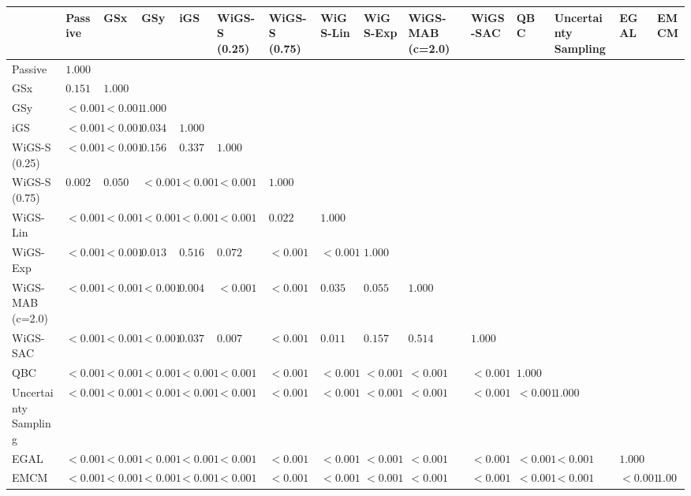\begin{tabular}{lllllllllllllll}
\toprule
 & Passive & GSx & GSy & iGS & WiGS-S (0.25) & WiGS-S (0.75) & WiGS-Lin & WiGS-Exp & WiGS-MAB (c=2.0) & WiGS-SAC & QBC & Uncertainty Sampling & EGAL & EMCM \\
\midrule
Passive & $1.000$ &  &  &  &  &  &  &  &  &  &  &  &  &  \\
GSx & $0.151$ & $1.000$ &  &  &  &  &  &  &  &  &  &  &  &  \\
GSy & $<0.001$ & $<0.001$ & $1.000$ &  &  &  &  &  &  &  &  &  &  &  \\
iGS & $<0.001$ & $<0.001$ & $0.034$ & $1.000$ &  &  &  &  &  &  &  &  &  &  \\
WiGS-S (0.25) & $<0.001$ & $<0.001$ & $0.156$ & $0.337$ & $1.000$ &  &  &  &  &  &  &  &  &  \\
WiGS-S (0.75) & $0.002$ & $0.050$ & $<0.001$ & $<0.001$ & $<0.001$ & $1.000$ &  &  &  &  &  &  &  &  \\
WiGS-Lin & $<0.001$ & $<0.001$ & $<0.001$ & $<0.001$ & $<0.001$ & $0.022$ & $1.000$ &  &  &  &  &  &  &  \\
WiGS-Exp & $<0.001$ & $<0.001$ & $0.013$ & $0.516$ & $0.072$ & $<0.001$ & $<0.001$ & $1.000$ &  &  &  &  &  &  \\
WiGS-MAB (c=2.0) & $<0.001$ & $<0.001$ & $<0.001$ & $0.004$ & $<0.001$ & $<0.001$ & $0.035$ & $0.055$ & $1.000$ &  &  &  &  &  \\
WiGS-SAC & $<0.001$ & $<0.001$ & $<0.001$ & $0.037$ & $0.007$ & $<0.001$ & $0.011$ & $0.157$ & $0.514$ & $1.000$ &  &  &  &  \\
QBC & $<0.001$ & $<0.001$ & $<0.001$ & $<0.001$ & $<0.001$ & $<0.001$ & $<0.001$ & $<0.001$ & $<0.001$ & $<0.001$ & $1.000$ &  &  &  \\
Uncertainty Sampling & $<0.001$ & $<0.001$ & $<0.001$ & $<0.001$ & $<0.001$ & $<0.001$ & $<0.001$ & $<0.001$ & $<0.001$ & $<0.001$ & $<0.001$ & $1.000$ &  &  \\
EGAL & $<0.001$ & $<0.001$ & $<0.001$ & $<0.001$ & $<0.001$ & $<0.001$ & $<0.001$ & $<0.001$ & $<0.001$ & $<0.001$ & $<0.001$ & $<0.001$ & $1.000$ &  \\
EMCM & $<0.001$ & $<0.001$ & $<0.001$ & $<0.001$ & $<0.001$ & $<0.001$ & $<0.001$ & $<0.001$ & $<0.001$ & $<0.001$ & $<0.001$ & $<0.001$ & $<0.001$ & $1.000$ \\
\bottomrule
\end{tabular}
